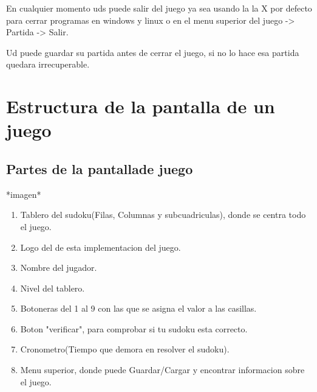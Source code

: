 \documentclass[11pt,fleqn]{book} %
\begin{document}
En cualquier momento uds puede salir del juego ya sea usando la la X por defecto para cerrar programas en windows y linux o en el menu superior del juego -> Partida -> Salir.

Ud puede guardar su partida antes de cerrar el juego, si no lo hace esa partida quedara irrecuperable.







\chapter{Estructura de la pantalla de un juego}

\section{Partes de la pantallade juego}

*imagen*


\begin{enumerate}
\item Tablero del sudoku(Filas, Columnas y subcuadriculas), donde se centra todo el juego.
\item Logo del de esta implementacion del juego.
\item Nombre del jugador.
\item Nivel del tablero.
\item Botoneras del 1 al 9 con las que se asigna el valor a las casillas.
\item Boton "verificar", para comprobar si tu sudoku esta correcto.
\item Cronometro(Tiempo que demora en resolver el sudoku).
\item Menu superior, donde puede Guardar/Cargar y encontrar informacion sobre el juego.

\end{enumerate}



\end{document}
